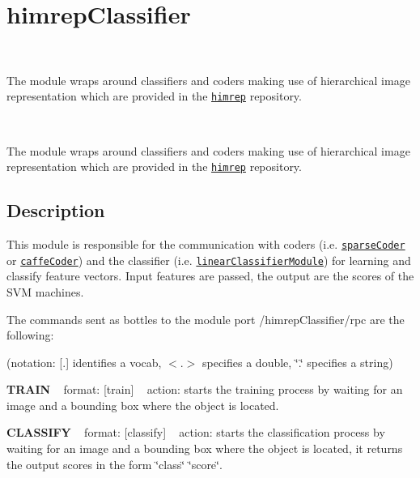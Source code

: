 \section{himrep\+Classifier}
\label{group__icub__himrepClassifier}


~\newline


The module wraps around classifiers and coders making use of hierarchical image representation which are provided in the \href{https://github.com/robotology/himrep}{\tt himrep} repository.  


~\newline


The module wraps around classifiers and coders making use of hierarchical image representation which are provided in the \href{https://github.com/robotology/himrep}{\tt himrep} repository. 

\hypertarget{group__iolReachingCalibration_intro_sec}{}\subsection{Description}\label{group__iolReachingCalibration_intro_sec}
This module is responsible for the communication with coders (i.\+e. \href{https://github.com/robotology/himrep/tree/master/modules/sparseCoder}{\tt sparse\+Coder} or \href{https://github.com/robotology/himrep/tree/master/modules/caffeCoder}{\tt caffe\+Coder}) and the classifier (i.\+e. \href{https://github.com/robotology/himrep/tree/master/modules/linearClassifierModule}{\tt linear\+Classifier\+Module}) for learning and classify feature vectors. Input features are passed, the output are the scores of the S\+VM machines.

The commands sent as bottles to the module port /himrep\+Classifier/rpc are the following\+:

(notation\+: \mbox{[}.\mbox{]} identifies a vocab, $<$.$>$ specifies a double, \char`\"{}.\char`\"{} specifies a string)

{\bfseries T\+R\+A\+IN} ~\newline
format\+: \mbox{[}train\mbox{]} ~\newline
action\+: starts the training process by waiting for an image and a bounding box where the object is located.

{\bfseries C\+L\+A\+S\+S\+I\+FY} ~\newline
format\+: \mbox{[}classify\mbox{]} ~\newline
action\+: starts the classification process by waiting for an image and a bounding box where the object is located, it returns the output scores in the form \char`\"{}class\char`\"{} \char`\"{}score\char`\"{}.


